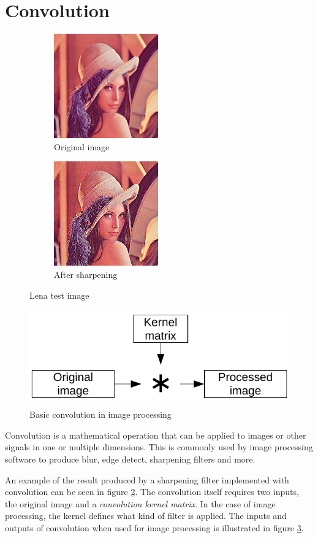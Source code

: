 \section{Convolution}
\begin{figure}
    \centering
    \begin{subfigure}{5cm}
        \centering
        \includegraphics[width=4.5cm]{img/Lena}
        \caption{Original image}
        \label{fig:LenaOriginal}
    \end{subfigure}
    \begin{subfigure}{5cm}
        \centering
        \includegraphics[width=4.5cm]{img/LenaProcessed}
        \caption{After sharpening}
    \end{subfigure}
    \caption{Lena test image}
    \label{fig:Lena}
\end{figure}
\begin{figure}
    \centering
    \includegraphics{img/BasicConvolution}
    \caption{Basic convolution in image processing}
    \label{fig:BasicConvolution}
\end{figure}

Convolution is a mathematical operation that can be applied to images or other signals in one or multiple dimensions.
This is commonly used by image processing software to produce blur, edge detect, sharpening filters and more.

An example of the result produced by a sharpening filter implemented with convolution can be seen in figure \ref{fig:Lena}.
The convolution itself requires two inputs, the original image and a \textit{convolution kernel matrix}.
In the case of image processing, the kernel defines what kind of filter is applied.
The inputs and outputs of convolution when used for image processing is illustrated in figure \ref{fig:BasicConvolution}.
